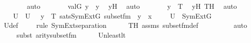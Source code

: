 \begin{isabellebody}
\ \ \ \ \ \ \isamarkupfalse%
\ auto\isanewline
\ \ \ \ \isamarkupfalse%
\ \isamarkupfalse%
\ {\isachardoublequoteopen}val{\isacharparenleft}{\kern0pt}G{\isacharcomma}{\kern0pt}\ y{\isacharprime}{\kern0pt}{\isacharprime}{\kern0pt}{\isacharprime}{\kern0pt}{\isacharparenright}{\kern0pt}\ {\isacharequal}{\kern0pt}\ y{\isachardoublequoteclose}\ \isamarkupfalse%
\ y{\isacharprime}{\kern0pt}H\ \isamarkupfalse%
\ auto\isanewline
\ \ \ \ \isamarkupfalse%
\ \isamarkupfalse%
\ {\isachardoublequoteopen}y\ {\isasymin}\ T{\isachardoublequoteclose}\ \isamarkupfalse%
\ y{\isacharprime}{\kern0pt}{\isacharprime}{\kern0pt}{\isacharprime}{\kern0pt}H\ TH\ \isamarkupfalse%
\ auto\isanewline
\ \ \isamarkupfalse%
\isanewline
\isanewline
\ \ \isamarkupfalse%
\ U\ \ {\isachardoublequoteopen}U\ {\isasymequiv}\ {\isacharbraceleft}{\kern0pt}\ y\ {\isasymin}\ T{\isachardot}{\kern0pt}\ sats{\isacharparenleft}{\kern0pt}SymExt{\isacharparenleft}{\kern0pt}G{\isacharparenright}{\kern0pt}{\isacharcomma}{\kern0pt}\ subset{\isacharunderscore}{\kern0pt}fm{\isacharparenleft}{\kern0pt}{}{\isacharcomma}{\kern0pt}\ {}{\isacharparenright}{\kern0pt}{\isacharcomma}{\kern0pt}\ {\isacharbrackleft}{\kern0pt}y{\isacharbrackright}{\kern0pt}\ {\isacharat}{\kern0pt}\ {\isacharbrackleft}{\kern0pt}x{\isacharbrackright}{\kern0pt}{\isacharparenright}{\kern0pt}\ {\isacharbraceright}{\kern0pt}{\isachardoublequoteclose}\isanewline
\isanewline
\ \ \isamarkupfalse%
\ {\isachardoublequoteopen}U\ {\isasymin}\ SymExt{\isacharparenleft}{\kern0pt}G{\isacharparenright}{\kern0pt}{\isachardoublequoteclose}\ \isanewline
\ \ \ \ \isamarkupfalse%
\ U{\isacharunderscore}{\kern0pt}def\isanewline
\ \ \ \ \isamarkupfalse%
{\isacharparenleft}{\kern0pt}rule\ SymExt{\isacharunderscore}{\kern0pt}separation{\isacharparenright}{\kern0pt}\isanewline
\ \ \ \ \isamarkupfalse%
\ TH\ assms\ subset{\isacharunderscore}{\kern0pt}fm{\isacharunderscore}{\kern0pt}def\ \isanewline
\ \ \ \ \ \ \ \isamarkupfalse%
\ auto{\isacharbrackleft}{\kern0pt}{}{\isacharbrackright}{\kern0pt}\isanewline
\ \ \ \ \isamarkupfalse%
{\isacharparenleft}{\kern0pt}subst\ arity{\isacharunderscore}{\kern0pt}subset{\isacharunderscore}{\kern0pt}fm{\isacharparenright}{\kern0pt}\isanewline
\ \ \ \ \isamarkupfalse%
\ Un{\isacharunderscore}{\kern0pt}least{\isacharunderscore}{\kern0pt}lt\ \isanewline

\end{isabellebody}
